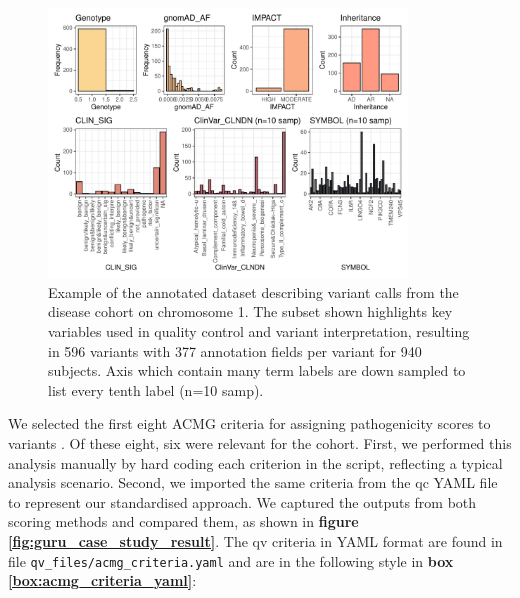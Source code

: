 \begin{figure}[!h]
    \centering
   \includegraphics[width=0.85\textwidth]{./images/Guru_singlecase_distribution_variables.pdf}
       \caption{Example of the annotated dataset describing variant calls from the disease cohort on chromosome 1. The subset shown highlights key variables used in quality control and variant interpretation, resulting in 596 variants with 377 annotation fields per variant for 940 subjects. Axis which contain many term labels are down sampled to list every tenth  label (n=10 samp).}
    \label{fig:guru_case_study_setup}
\end{figure}

We selected the first eight ACMG criteria for assigning pathogenicity scores to variants \cite{richards2015standards}. Of these eight, six were relevant for the cohort.
First, we performed this analysis manually by hard coding each criterion in the script, reflecting a typical analysis scenario. Second, we imported the same criteria from the \ac{qc} YAML file to represent our standardised approach. We captured the outputs from both scoring methods and compared them, as shown in \textbf{figure \ref{fig:guru_case_study_result}}.
The \ac{qv} criteria in YAML format are found in file \texttt{qv\_files/acmg\_criteria.yaml} and are in the following style in 
\textbf{box \ref{box:acmg_criteria_yaml}}:

